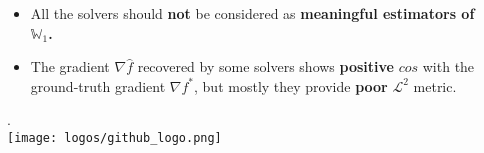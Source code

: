 \documentclass[final]{beamer}
\newlength{\sepwidth}
\newlength{\colwidth}
\newcommand{\separatorcolumn}{\begin{column}{\sepwidth}\end{column}}
\begin{document}
\begin{frame}[t]
\begin{columns}[t]
\begin{column}{\colwidth}
\begin{block}{\noindent{}}
\begin{itemize}
    \item{All the solvers should \textbf{not} be considered as \bf{meaningful estimators} of $\mathbb{W}_{1}$.}
    \item{The gradient $\nabla \hat{f}$ recovered by some solvers shows \textbf{positive} $cos$ with the ground-truth gradient $\nabla f^{*}$, but mostly they provide \textbf{poor} $\mathcal{L}^{2}$ metric.}
\end{itemize}

\vspace{6 mm}
.\\[0.4 cm] 
\vspace{-0.5mm}\texttt{[image: logos/github\_logo.png]}

\vspace{4 mm}

 
  \end{block}

\end{column}

\separatorcolumn
\end{columns}

\end{frame}
\end{document}
